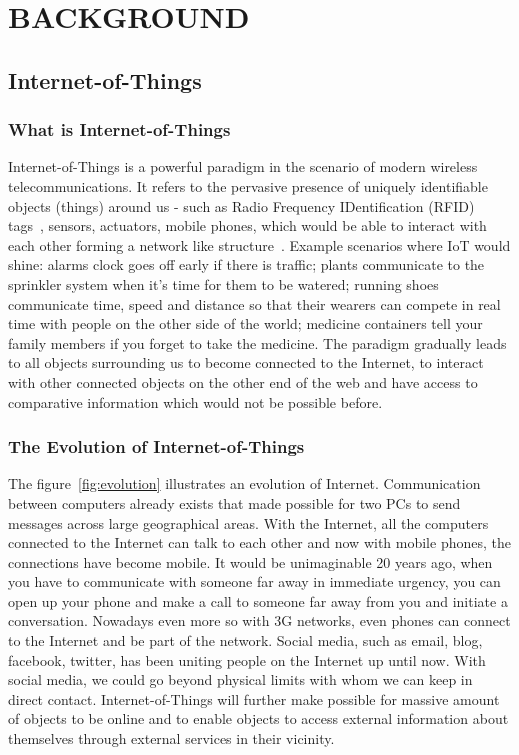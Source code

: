 \cleardoublepage
\singlespacing
\chapter{BACKGROUND}
\label{c:background}
\doublespacing\nointerlineskip

\section{Internet-of-Things}

\subsection{What is Internet-of-Things}

Internet-of-Things is a powerful paradigm in the scenario of modern wireless
telecommunications. It refers to the pervasive presence of uniquely identifiable
objects (things) around us - such as Radio Frequency IDentification (RFID)
tags~\cite{Shepard2005}, sensors, actuators, mobile phones, which would be able
to interact with each other forming a network like
structure~\cite{Atzori20102787}. Example scenarios where IoT would shine: alarms
clock goes off early if there is traffic; plants communicate to the sprinkler
system when it's time for them to be watered; running shoes communicate time,
speed and distance so that their wearers can compete in real time with people on
the other side of the world; medicine containers tell your family members if you
forget to take the medicine. The paradigm gradually leads to all objects
surrounding us to become connected to the Internet, to interact with other
connected objects on the other end of the web and have access to comparative
information which would not be possible before.

\subsection{The Evolution of Internet-of-Things}

The figure~\ref{fig:evolution} illustrates an evolution of Internet.
Communication between computers already exists that made possible for two PCs to
send messages across large geographical areas. With the Internet, all the
computers connected to the Internet can talk to each other and now with mobile
phones, the connections have become mobile.
It would be unimaginable 20 years ago, when you have to communicate with someone
far away in immediate urgency, you can open up your phone and make a call to
someone far away from you and initiate a conversation. Nowadays even more so
with 3G networks, even phones can connect to the Internet and be part of the
network.
Social media, such as email, blog, facebook, twitter, has been uniting
people on the Internet up until now. With social media, we could go beyond
physical limits with whom we can keep in direct contact. Internet-of-Things will
further make possible for massive amount of objects to be online and to enable
objects to access external information about themselves through external
services in their vicinity.~\cite{Associati2011a}

